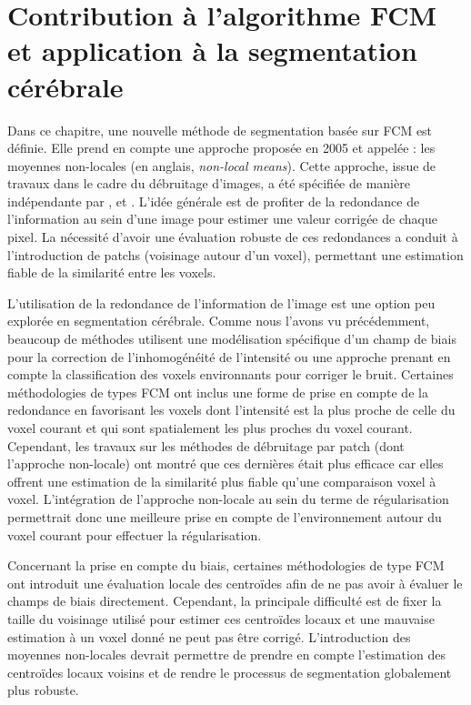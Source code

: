 \chapter{Contribution à l'algorithme FCM et application à la segmentation cérébrale}
\label{chap:nlfcm}
\minitoc

Dans ce chapitre, une nouvelle méthode de segmentation basée sur FCM est définie.
Elle prend en compte une approche proposée en 2005 et appelée : les moyennes non-locales (en anglais, \emph{non-local means}).
Cette approche, issue de travaux dans le cadre du débruitage d'images, a été spécifiée de manière indépendante par \cite{Buades:MMS:2005}, et \cite{Awate:PAMI:2006}.
L'idée générale est de profiter de la redondance de l'information au sein d'une image pour estimer une valeur corrigée de chaque pixel.
La nécessité d'avoir une évaluation robuste de ces redondances a conduit à l'introduction de patchs (voisinage autour d'un voxel), permettant une estimation fiable de la similarité entre les voxels.

L'utilisation de la redondance de l'information de l'image est une option peu explorée en segmentation cérébrale.
Comme nous l'avons vu précédemment, beaucoup de méthodes utilisent une modélisation spécifique d'un champ de biais pour la correction de l'inhomogénéité de l'intensité ou une approche prenant en compte la classification des voxels environnants pour corriger le bruit.
Certaines méthodologies de types FCM ont inclus une forme de prise en compte de la redondance en favorisant les voxels dont l'intensité est la plus proche de celle du voxel courant et qui sont spatialement les plus proches du voxel courant.
Cependant, les travaux sur les méthodes de débruitage par patch (dont l'approche non-locale) ont montré que ces dernières était plus efficace car elles offrent une estimation de la similarité plus fiable qu'une comparaison voxel à voxel.
L'intégration de l'approche non-locale au sein du terme de régularisation permettrait donc une meilleure prise en compte de l'environnement autour du voxel courant pour effectuer la régularisation.

Concernant la prise en compte du biais, certaines méthodologies de type FCM ont introduit une évaluation locale des centroïdes afin de ne pas avoir à évaluer le champs de biais directement.
Cependant, la principale difficulté est de fixer la taille du voisinage utilisé pour estimer ces centroïdes locaux et une mauvaise estimation à un voxel donné ne peut pas être corrigé.
L'introduction des moyennes non-locales devrait permettre de prendre en compte l'estimation des centroïdes locaux voisins et de rendre le processus de segmentation globalement plus robuste.

